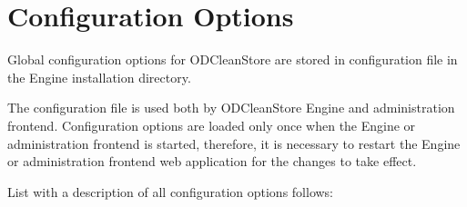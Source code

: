 \chapter{Configuration Options}
 \label{chap:configOptions}
Global configuration options for ODCleanStore are stored in configuration file  in the Engine installation directory.

The configuration file is used both by ODCleanStore Engine and administration frontend. Configuration options are loaded only once when the Engine or administration frontend is started, therefore, it is necessary to restart the Engine or administration frontend web application for the changes to take effect.

List with a description of all configuration options follows:

